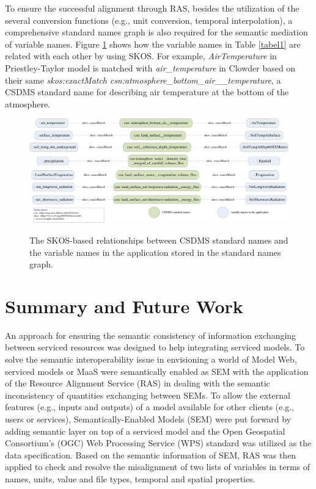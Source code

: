 \documentclass[review]{elsarticle}
\begin{document}
To ensure the successful alignment through RAS, besides the utilization of the several conversion functions (e.g., unit conversion, temporal interpolation), a comprehensive standard names graph is also required for the semantic mediation of variable names. Figure \ref{figure8} shows how the variable names in Table \ref{tabel1} are related with each other by using SKOS. For example, \textit{AirTemperature} in Priestley-Taylor model is matched with \textit{air\_temperature} in Clowder based on their same \textit{skos:exactMatch} \textit{csn:atmosphere\_bottom\_air\_\_temperature}, a CSDMS standard name for describing air temperature at the bottom of the atmosphere.

\begin{landscape}
\begin{figure}[!htbp]
\centering
\includegraphics[scale=0.3]{../figures/figure_8}
\label{figure8}
\caption{The SKOS-based relationships between CSDMS standard names and the variable names in the application stored in the standard names graph.}
\end{figure}
\end{landscape}

\section{Summary and Future Work} An approach for ensuring the semantic consistency of information exchanging between serviced resources was designed to help integrating serviced models. To solve the semantic interoperability issue in envisioning a world of Model Web, serviced models or MaaS were semantically enabled as SEM with the application of the Resource Alignment Service (RAS) in dealing with the semantic inconsistency of quantities exchanging between SEMs. To allow the external features (e.g., inputs and outputs) of a model available for other clients (e.g., users or services), Semantically-Enabled Models (SEM) were put forward by adding semantic layer on top of a serviced model and the Open Geospatial Consortium’s (OGC) Web Processing Service (WPS) standard was utilized as the data specification. Based on the semantic information of SEM, RAS was then applied to check and resolve the misalignment of two lists of variables in terms of names, units, value and file types, temporal and spatial properties.  
\end{document}
